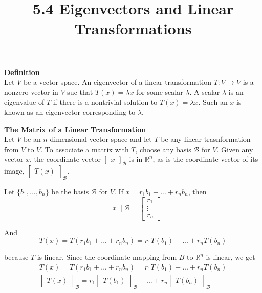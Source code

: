 \documentclass{article}
\title{5.4 Eigenvectors and Linear Transformations}
\begin{document}
  \maketitle
  \textbf{Definition}\\
  Let $ V $ be a vector space. An eigenvector of a linear transformation $ T:V\to V $ is a nonzero vector in $ V $ suc that $ T(x)=\lambda x $ for some scalar $ \lambda $. A scalar $ \lambda $ is an eigenvalue of $ T $ if there is a nontrivial solution to $ T(x)=\lambda x $. Such an $ x $ is known as an eigenvector corresponding to $ \lambda $.

  \textbf{The Matrix of a Linear Transformation}\\
  Let $ V $ be an $ n $ dimensional vector space and let $ T $ be any linear trasnformation from $ V $ to $ V $. To associate a matrix with $ T $, choose any basis $ \mathcal{B} $ for $ V $. Given any vector $ x $, the coordinate vector $ \begin{bmatrix}
    x
  \end{bmatrix}_\mathcal{B} $ is in $ \mathbb{R}^{n} $, as is the coordinate vector of its image, $ \begin{bmatrix}
    T(x)
  \end{bmatrix}_\mathcal{B} $.

  Let $ \{ b_1,...,b_n \} $ be the basis $ \mathcal{B} $ for $ V $. If $ x=r_1b_1+...+r_nb_n $, then
  \[
    \begin{bmatrix}
    x
  \end{bmatrix}\mathcal{B} =
  \begin{bmatrix}
    r_1\\
    \vdots\\
    r_n
  \end{bmatrix}
  \]
  
  And
  \[
    T(x)=T(r_1b_1+...+r_nb_n)=r_1T(b_1)+...+r_nT(b_n)
  \]

  because $ T $ is linear. Since the coordinate mapping from $ B $ to $ \mathbb{R}^{n} $ is linear, we get
  \[
    \begin{gathered}
     T(x)=T(r_1b_1+...+r_nb_n)=r_1T(b_1)+...+r_nT(b_n)\\
     \begin{bmatrix}
       T(x)
     \end{bmatrix}_\mathcal{B}=r_1
     \begin{bmatrix}
       T(b_1)
     \end{bmatrix}_\mathcal{B}+...+
     r_n\begin{bmatrix}
       T(b_n)
     \end{bmatrix}_\mathcal{B}
    \end{gathered}
  \]
  
\end{document}
